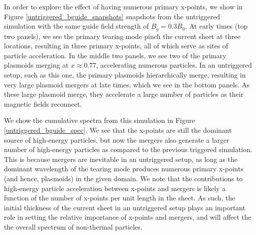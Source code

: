\documentclass[iop,twocolappendix]{emulateapj}
\begin{document}
In order to explore the effect of having numerous primary x-points, we show in Figure \ref{untriggered_bguide_snapshots} snapshots from the untriggered simulation with the same guide field strength of $B_{g}=0.3B_{0}$.  At early times (top two panels), we see the primary tearing mode pinch the current sheet at three locations, resulting in three primary x-points, all of which serve as sites of particle acceleration.  In the middle two panels, we see two of the primary plasmoids merging at $x \approx 0.77$, accelerating numerous particles.  In an untriggered setup, such as this one, the primary plasmoids hierarchically merge, resulting in very large plasmoid mergers at late times, which we see in the bottom panels.  As these large plasmoid merge, they accelerate a large number of particles as their magnetic fields reconnect.  

We show the cumulative spectra from this simulation in Figure \ref{untriggered_bguide_spec}.  We see that the x-points are still the dominant source of high-energy particles, but now the mergers also generate a larger number of high-energy particles as compared to the previous triggered simulation.  This is because mergers are inevitable in an untriggered setup, as long as the dominant wavelength of the tearing mode produces numerous primary x-points (and hence, plasmoids) in the given domain.  We note that the contributions to high-energy particle acceleration between x-points and mergers is likely a function of the number of x-points per unit length in the sheet.  As such, the initial thickness of the current sheet in an untriggered setup plays an important role in setting the relative importance of x-points and mergers, and will affect the the overall spectrum of non-thermal particles.  

\end{document}
